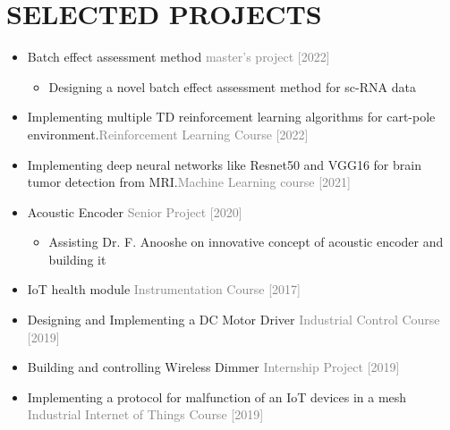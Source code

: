 \documentclass[10pt,a4paper,sans]{moderncv} %
\begin{document}
	\section{SELECTED PROJECTS}
        \begin{itemize}
            \item Batch effect assessment method \hfill \textcolor{gray}{master's project [2022]}
            \begin{itemize}
            \item Designing a novel batch effect assessment method for sc-RNA data
            \end{itemize}
            \item Implementing multiple TD reinforcement learning algorithms for cart-pole environment.\hfill \textcolor{gray}{Reinforcement Learning Course [2022]}
            \item Implementing deep neural networks like Resnet50 and VGG16 for brain tumor detection from MRI.\hfill \textcolor{gray}{Machine Learning course [2021]}
            \item Acoustic Encoder \hfill \textcolor{gray}{Senior Project [2020]} 
            \begin{itemize}
            \item Assisting Dr. F. Anooshe on innovative concept of acoustic encoder and building it
            \end{itemize}
            \item IoT health module \hfill \textcolor{gray}{Instrumentation Course [2017]}
            \item Designing and Implementing a DC Motor Driver \hfill \textcolor{gray}{Industrial Control Course [2019]}
            \item Building and controlling Wireless Dimmer \hfill \textcolor{gray}{Internship Project [2019]}
            \item Implementing a protocol for malfunction of an IoT devices in a mesh \hfill \textcolor{gray}{Industrial Internet of Things Course [2019]}
            \end{itemize}
\end{document}
